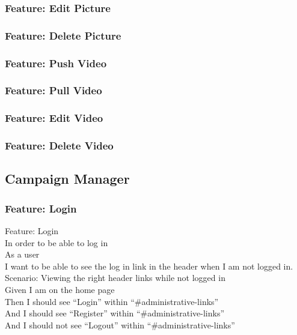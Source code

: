 \documentclass[12pt]{article}
\begin{document}
\subsubsection{Feature: Edit Picture}
\subsubsection{Feature: Delete Picture}

\subsubsection{Feature: Push Video}
\subsubsection{Feature: Pull Video}
\subsubsection{Feature: Edit Video}
\subsubsection{Feature: Delete Video}

\subsection{Campaign Manager}

\subsubsection{Feature: Login}

Feature: Login \\
  In order to be able to log in \\
  As a user \\
  I want to be able to see the log in link in the header when I am not logged in. \\

Scenario: Viewing the right header links while not logged in  \\
  Given I am on the home page \\
  Then I should see ``Login'' within ``\#administrative-links'' \\
  And I should see ``Register'' within ``\#administrative-links'' \\
  And I should not see ``Logout'' within ``\#administrative-links'' \\
\end{document}
